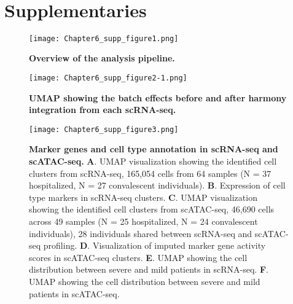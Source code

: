\documentclass{book}
\begin{document}
\begin{refsection}
\clearpage
\newpage
~
\clearpage
\newpage
\section*{Supplementaries}
\renewcommand{\thefigure}{\textbf{Figure S\arabic{chapter}.\arabic{figure}}}
\setcounter{figure}{0}

\begin{figure}[!ht]
  \centering
  \texttt{[image: Chapter6\_supp\_figure1.png]}
  \caption{\label{fig:chp6supfig1}
    \textbf{Overview of the analysis pipeline.}
}
\end{figure}

\begin{figure}[!ht]
  \centering
  \texttt{[image: Chapter6\_supp\_figure2-1.png]}
  \caption{\label{fig:chp6supfig2}
    \textbf{UMAP showing the batch effects before and after harmony integration from each scRNA-seq.}
  }
\end{figure}


\begin{figure}[!ht]
  \centering
  \texttt{[image: Chapter6\_supp\_figure3.png]}
  \caption{\label{fig:chp6supfig3}
    \textbf{Marker genes and cell type annotation in scRNA-seq and scATAC-seq.}
    \textbf{A}. UMAP visualization showing the identified cell clusters from scRNA-seq, 165,054 cells from 64 samples (N = 37 hospitalized, N = 27 convalescent individuals).
    \textbf{B}. Expression of cell type markers in scRNA-seq clusters.
    \textbf{C}. UMAP visualization showing the identified cell clusters from scATAC-seq, 46,690 cells across 49 samples (N = 25 hospitalized, N = 24 convalescent individuals), 28 individuals shared between scRNA-seq and scATAC-seq profiling.
    \textbf{D}. Visualization of imputed marker gene activity scores in scATAC-seq clusters.
    \textbf{E}. UMAP showing the cell distribution between severe and mild patients in scRNA-seq.
    \textbf{F}. UMAP showing the cell distribution between severe and mild patients in scATAC-seq.
}
\end{figure}


\end{refsection}
\end{document}
